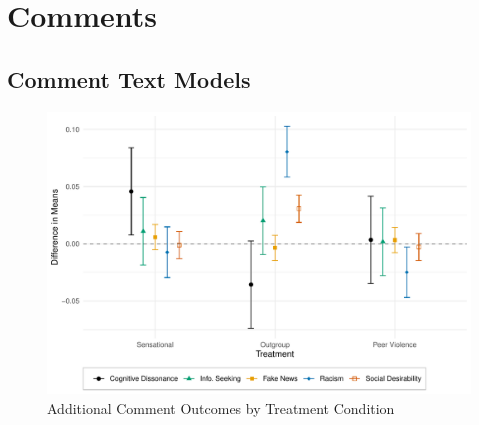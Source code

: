 \documentclass[]{article}
\begin{document}
\section{Comments}





\subsection{Comment Text Models}
{


}

\begin{landscape}


\end{landscape}

\begin{figure}[!htbp]
  \centering
  \caption{Additional Comment Outcomes by Treatment Condition}
  \includegraphics[width=.8\textwidth]{figures/additional_text_oe.pdf}
\end{figure}
\end{document}
